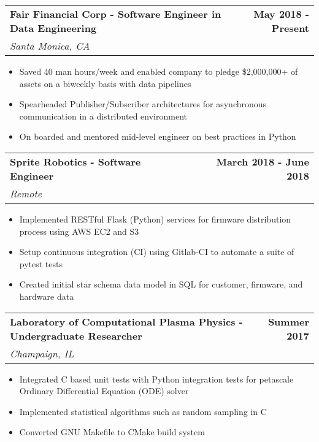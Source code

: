 \documentclass[letterpaper]{article}
\newenvironment{details}
{\begin{itemize}}
{\end{itemize}}
\begin{document}
\noindent
\begin{tabularx}{\textwidth}{@{}X r@{}}
	\textbf{Fair Financial Corp - Software Engineer in Data Engineering} & \textbf{May 2018 - Present} \\
	\textit{Santa Monica, CA}
\end{tabularx}
\begin{details}
	\item Saved 40 man hours/week and enabled company to pledge \$2,000,000+ of assets on a biweekly basis with data pipelines
	\item Spearheaded Publisher/Subscriber architectures for asynchronous communication in a distributed environment
	\item On boarded and mentored mid-level engineer on best practices in Python
\end{details}
    \noindent
  \begin{tabularx}{\textwidth}{@{}X r@{}}
  	\textbf{Sprite Robotics - Software Engineer} & \textbf{March 2018 - June 2018} \\
  	\textit{Remote}
  \end{tabularx}
  \begin{details}
	\item Implemented RESTful Flask (Python) services for firmware distribution process using AWS EC2 and S3
	\item Setup continuous integration (CI) using Gitlab-CI to automate a suite of pytest tests
	\item Created initial star schema data model in SQL for customer, firmware, and hardware data
  \end{details}

\noindent
\begin{tabularx}{\textwidth}{@{}X r@{}}
	\textbf{Laboratory of Computational Plasma Physics - Undergraduate Researcher} & \textbf{Summer 2017} \\ \textit{Champaign, IL}
\end{tabularx}

\begin{details}
	\item Integrated C based unit tests with Python integration tests for petascale Ordinary Differential Equation (ODE) solver
	\item Implemented statistical algorithms such as random sampling in C
	\item Converted GNU Makefile to CMake build system 
\end{details}
\end{document}
